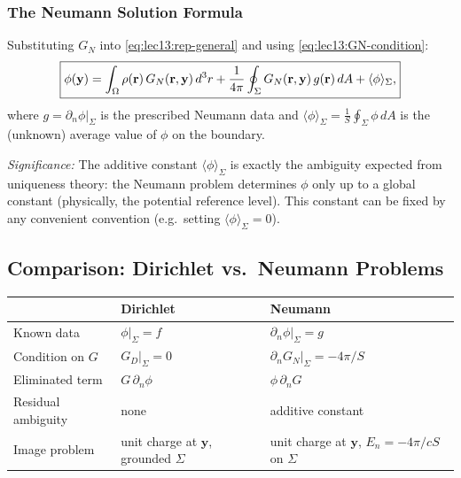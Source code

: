 \subsubsection*{The Neumann Solution Formula}
Substituting $G_N$ into \eqref{eq:lec13:rep-general} and using \eqref{eq:lec13:GN-condition}:
\begin{equation}\label{eq:lec13:neumann-solution}
  \boxed{
    \phi(\mathbf{y})
    = \int_\Omega \rho(\mathbf{r})\, G_N(\mathbf{r},\mathbf{y})\, d^3r
    + \frac{1}{4\pi}\oint_\Sigma G_N(\mathbf{r},\mathbf{y})\, g(\mathbf{r})\, dA
    + \langle\phi\rangle_\Sigma,
  }
\end{equation}
where $g = \partial_n\phi|_\Sigma$ is the prescribed Neumann data and
$\langle\phi\rangle_\Sigma = \frac{1}{S}\oint_\Sigma\phi\,dA$ is the
(unknown) average value of $\phi$ on the boundary.

\textit{Significance:} The additive constant $\langle\phi\rangle_\Sigma$ is exactly the
ambiguity expected from uniqueness theory: the Neumann problem determines $\phi$ only up
to a global constant (physically, the potential reference level).  This constant can be
fixed by any convenient convention (e.g.\ setting $\langle\phi\rangle_\Sigma=0$).

\subsection{Comparison: Dirichlet vs.\ Neumann Problems}\label{subsec:lec13-comparison}

\begin{center}
\begin{tabular}{lll}
  \toprule
  & \textbf{Dirichlet} & \textbf{Neumann} \\
  \midrule
  Known data & $\phi|_\Sigma = f$ & $\partial_n\phi|_\Sigma = g$ \\
  Condition on $G$ & $G_D|_\Sigma = 0$ & $\partial_n G_N|_\Sigma = -4\pi/S$ \\
  Eliminated term & $G\,\partial_n\phi$ & $\phi\,\partial_n G$ \\
  Residual ambiguity & none & additive constant \\
  Image problem & unit charge at $\mathbf{y}$, grounded $\Sigma$ & unit charge at $\mathbf{y}$,
  $E_n = -4\pi/cS$ on $\Sigma$ \\
  \bottomrule
\end{tabular}
\end{center}

